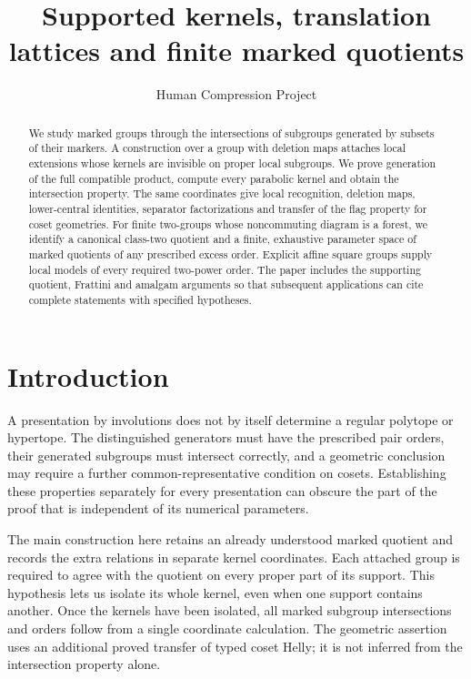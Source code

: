 
\title{Supported kernels, translation lattices and finite marked quotients}
\author{Human Compression Project}
\date{}

\maketitle
\begin{abstract}
We study marked groups through the intersections of subgroups generated
by subsets of their markers. A construction over a group with deletion
maps attaches local extensions whose kernels are invisible on proper
local subgroups. We prove generation of the full compatible product,
compute every parabolic kernel and obtain the intersection property. The
same coordinates give local recognition, deletion maps, lower-central
identities, separator factorizations and transfer of the flag property
for coset geometries. For finite two-groups whose noncommuting diagram
is a forest, we identify a canonical class-two quotient and a finite,
exhaustive parameter space of marked quotients of any prescribed excess
order. Explicit affine square groups supply local models of every
required two-power order. The paper includes the supporting quotient,
Frattini and amalgam arguments so that subsequent applications can cite
complete statements with specified hypotheses.
\end{abstract}
\section{Introduction}
A presentation by involutions does not by itself determine a regular
polytope or hypertope. The distinguished generators must have the
prescribed pair orders, their generated subgroups must intersect
correctly, and a geometric conclusion may require a further
common-representative condition on cosets. Establishing these properties
separately for every presentation can obscure the part of the proof that
is independent of its numerical parameters.

The main construction here retains an already understood marked quotient
and records the extra relations in separate kernel coordinates. Each
attached group is required to agree with the quotient on every proper
part of its support. This hypothesis lets us isolate its whole kernel,
even when one support contains another. Once the kernels have been
isolated, all marked subgroup intersections and orders follow from a
single coordinate calculation. The geometric assertion uses an
additional proved transfer of typed coset Helly; it is not inferred from
the intersection property alone.

